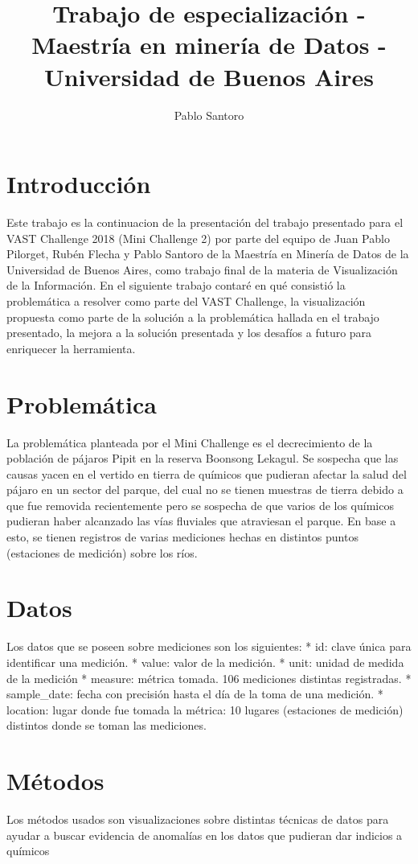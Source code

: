 \documentclass[a4paper, twopager]{article}
\author{Pablo Santoro}
\title{Trabajo de especialización - Maestría en minería de Datos - Universidad de Buenos Aires}
\begin{document}
\maketitle
\newpage
\tableofcontents
\newpage
\section{Introducción}
Este trabajo es la continuacion de la presentación del trabajo presentado para el VAST Challenge 2018 (Mini Challenge 2) por parte del equipo de Juan Pablo Pilorget, Rubén Flecha y Pablo Santoro de la Maestría en Minería de Datos de la Universidad de Buenos Aires, como trabajo final de la materia de Visualización de la Información. En el siguiente trabajo contaré en qué consistió la problemática a resolver como parte del VAST Challenge, la visualización propuesta como parte de la solución a la problemática hallada en el trabajo presentado, la mejora a la solución presentada y los desafíos a futuro para enriquecer la herramienta.
\section{Problemática}
La problemática planteada por el Mini Challenge es el decrecimiento de la población de pájaros Pipit en la reserva Boonsong Lekagul. Se sospecha que las causas yacen en el vertido en tierra de químicos que pudieran afectar la salud del pájaro en un sector del parque, del cual no se tienen muestras de tierra debido a que fue removida recientemente pero se sospecha de que varios de los químicos pudieran haber alcanzado las vías fluviales que atraviesan el parque. En base a esto, se tienen registros de varias mediciones hechas en distintos puntos (estaciones de medición) sobre los ríos.
\section{Datos}
Los datos que se poseen sobre mediciones son los siguientes:
* id: clave única para identificar una medición.
* value: valor de la medición.
* unit: unidad de medida de la medición
* measure: métrica tomada. 106 mediciones distintas registradas.
* sample_date: fecha con precisión hasta el día de la toma de una medición.
* location: lugar donde fue tomada la métrica: 10 lugares (estaciones de medición) distintos donde se toman las mediciones.
\section{Métodos}
Los métodos usados son visualizaciones sobre distintas técnicas de datos para ayudar a buscar evidencia de anomalías en los datos que pudieran dar indicios a químicos 
\end{document}

